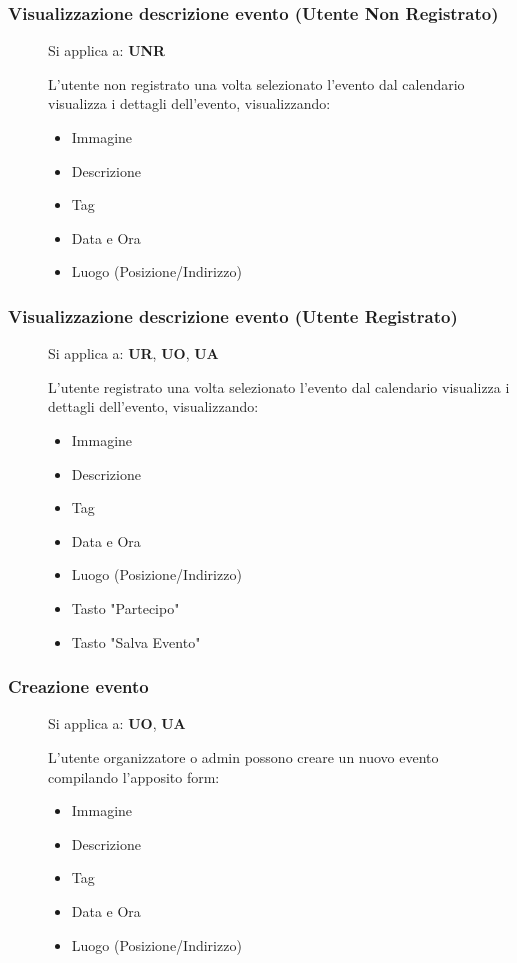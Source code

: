\documentclass{article}
\begin{document}
\subsubsection{Visualizzazione descrizione evento (Utente Non Registrato)}
\begin{description}
    \item[] Si applica a: \textbf{UNR}
    \item[] L'utente non registrato una volta selezionato l'evento dal calendario visualizza i dettagli dell'evento, visualizzando:
        \begin{itemize}
            \item Immagine
            \item Descrizione
            \item Tag
            \item Data e Ora
            \item Luogo (Posizione/Indirizzo)
        \end{itemize}
\end{description}
\subsubsection{Visualizzazione descrizione evento (Utente Registrato)}
\begin{description}
    \item[] Si applica a: \textbf{UR}, \textbf{UO}, \textbf{UA}
    \item[] L'utente registrato una volta selezionato l'evento dal calendario visualizza i dettagli dell'evento, visualizzando:
        \begin{itemize}
            \item Immagine
            \item Descrizione
            \item Tag
            \item Data e Ora
            \item Luogo (Posizione/Indirizzo)
            \item Tasto "Partecipo"
            \item Tasto "Salva Evento"
        \end{itemize}
\end{description}
\subsubsection{Creazione evento}
\begin{description}
    \item[] Si applica a: \textbf{UO}, \textbf{UA}
    \item[] L'utente organizzatore o admin possono creare un nuovo evento compilando l'apposito form:
        \begin{itemize}
            \item Immagine
            \item Descrizione
            \item Tag
            \item Data e Ora
            \item Luogo (Posizione/Indirizzo)
        \end{itemize}
\end{description}
\end{document}
